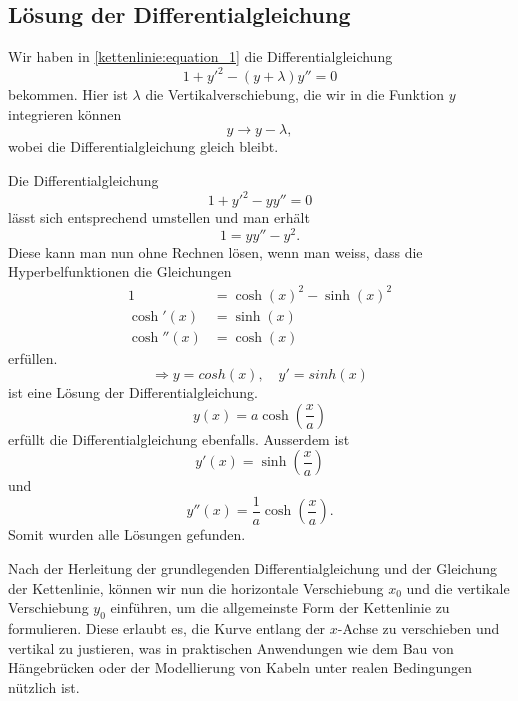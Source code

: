 \subsection{Lösung der Differentialgleichung
\label{kettenlinie:subsection:Lösung der Differentialgleichung}}
Wir haben in \eqref{kettenlinie:equation_1} die Differentialgleichung
\begin{equation}
	1 + y'^2 - (y + \lambda) y''
	=
	0
\end{equation}
bekommen.
Hier ist \(\lambda\) die Vertikalverschiebung, die wir in die Funktion \(y\) integrieren können
\begin{equation}
	y
	\rightarrow
	y - \lambda ,
\end{equation}
wobei die Differentialgleichung gleich bleibt.

Die Differentialgleichung
\begin{equation}
	1 + y'^2 - y y''
	=
	0
\end{equation}
lässt sich entsprechend umstellen und man erhält
\begin{equation}
	1
	=
	y y'' - y^2.
\end{equation}
Diese kann man nun ohne Rechnen lösen, wenn man weiss, dass die Hyperbelfunktionen die Gleichungen
\begin{align*}
	1 &= \cosh(x)^2 - \sinh(x)^2 \\
	\cosh'(x) &= \sinh(x) \\
	\cosh''(x) &= \cosh(x)
\end{align*}
erfüllen.
\begin{equation}
	\Rightarrow
	y
	=
	cosh(x), \quad
	y'
	=
	sinh(x)
\end{equation}
ist eine Lösung der Differentialgleichung.
\begin{equation}
	y(x)
	=
	a \cosh\left(\frac{x}{a}\right)
\end{equation}
erfüllt die Differentialgleichung ebenfalls. Ausserdem ist 
\begin{equation}
	y'(x)
	=
	\sinh\left(\frac{x}{a}\right)
\end{equation}
und
\begin{equation}
	y''(x)
	=
	\frac{1}{a} \cosh\left(\frac{x}{a}\right).
\end{equation}
Somit wurden alle Lösungen gefunden.

Nach der Herleitung der grundlegenden Differentialgleichung und der Gleichung der Kettenlinie, können wir nun die horizontale Verschiebung \(x_0\) und die vertikale Verschiebung \(y_0\) einführen, um die allgemeinste Form der Kettenlinie zu formulieren.
Diese erlaubt es, die Kurve entlang der \(x\)-Achse zu verschieben und vertikal zu justieren, was in praktischen Anwendungen wie dem Bau von Hängebrücken oder der Modellierung von Kabeln unter realen Bedingungen nützlich ist.

